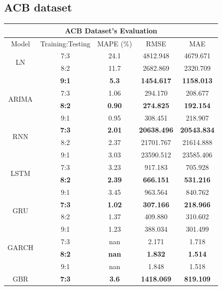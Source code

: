 \documentclass{ieeeojies}
\begin{document}
\subsection{ACB dataset} 
\begin{table}[H]
    \centering
    \begin{tabular}{|c|c|c|c|c|}
         \hline
         \multicolumn{5}{|c|}{\textbf{ACB Dataset's Evaluation}}\\
         \hline
         \centering Model & Training:Testing & MAPE (\%) & RMSE & MAE\\
         \hline
         \multirow{2}{*}{LN} & 7:3 & 24.1 & 4812.948 & 4679.671 \\ 
         & 8:2 & 11.7 & 2682.869 & 2320.709 \\ 
         & \textbf{9:1} & \textbf{5.3} & \textbf{1454.617} & \textbf{1158.013}\\
         \hline
         \multirow{2}{*}{ARIMA} & 7:3 & 1.06 & 294.170 & 208.677 \\ 
         & \textbf{8:2} & \textbf{0.90} & \textbf{274.825} & \textbf{192.154} \\ 
         & 9:1 & 0.95 & 308.451 & 218.907 \\
         \hline
         \multirow{2}{*}{RNN} & \textbf{7:3} & \textbf{2.01} & \textbf{20638.496} & \textbf{20543.834} \\ 
         &  8:2 & 2.37 & 21701.767 & 21614.888 \\ 
         & 9:1 & 3.03 & 23590.512 & 23585.406 \\
         \hline
         \multirow{2}{*}{LSTM} & 7:3 & 3.23 & 917.183 & 705.928 \\ 
         & \textbf{8:2} & \textbf{2.39} & \textbf{666.151} & \textbf{531.216} \\ 
         & 9:1 & 3.45 & 963.564 & 840.762 \\
         \hline
         \multirow{2}{*}{GRU} & \textbf{7:3} & \textbf{1.02} & \textbf{307.166} & \textbf{218.966} \\ 
         & 8:2 & 1.37 & 409.880 & 310.602 \\ 
         & 9:1 & 1.23 & 388.034 & 301.499 \\
         \hline
         \multirow{2}{*}{GARCH} & 7:3 & nan & 2.171 & 1.718 \\ 
         & \textbf{8:2} & \textbf{nan} & \textbf{1.832} & \textbf{1.514} \\
         & 9:1 & nan & 1.848 & 1.518 \\
         \hline
         \multirow{2}{*}{GBR} & \textbf{7:3} & \textbf{3.6} & \textbf{1418.069} & \textbf{819.109} \\ 

\end{tabular}
\end{table}
\end{document}
